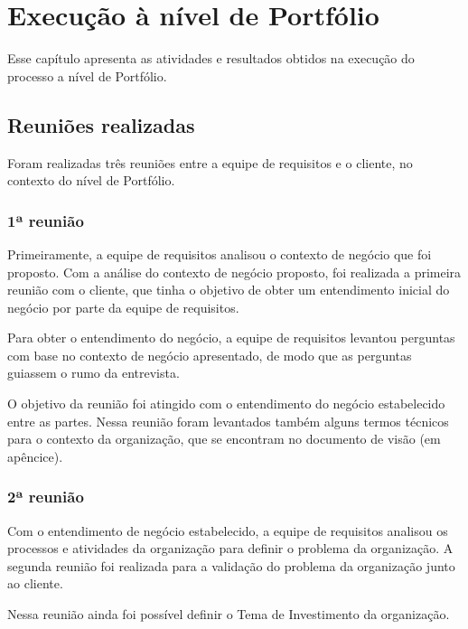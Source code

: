 \chapter{Execução à nível de Portfólio}
  
  Esse capítulo apresenta as atividades e resultados obtidos na execução do processo a nível de Portfólio.
  
  \section{Reuniões realizadas}
    
    Foram realizadas três reuniões entre a equipe de requisitos e o cliente, no contexto do nível de Portfólio. 
    
    \subsection{1ª reunião}
      
      Primeiramente, a equipe de requisitos analisou o contexto de negócio que foi proposto.
      Com a análise do contexto de negócio proposto, foi realizada a primeira reunião com o cliente, que tinha o objetivo de 
      obter um entendimento inicial do negócio por parte da equipe de requisitos. 
      
      Para obter o entendimento do negócio, a equipe de requisitos levantou perguntas com base no contexto de negócio apresentado, 
      de modo que as perguntas guiassem o rumo da entrevista.
      
      O objetivo da reunião foi atingido com o entendimento do negócio estabelecido entre as partes. Nessa reunião 
      foram levantados também alguns termos técnicos para o contexto da organização, que se encontram no documento de visão
      (em apêncice).
      
    \subsection{2ª reunião}
    
      Com o entendimento de negócio estabelecido, a equipe de requisitos analisou os processos e atividades da 
      organização para definir o problema da organização. A segunda reunião foi realizada para a validação do problema 
      da organização junto ao cliente.
      
      Nessa reunião ainda foi possível definir o Tema de Investimento da organização.
    
